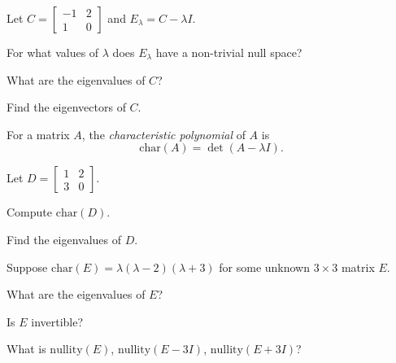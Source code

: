 \documentclass[14pt]{problemset}
\newcommand{\nnul}{\mathrm{nullity}}
\newcommand{\mat}[1]{\begin{bmatrix}#1\end{bmatrix}}
\newcommand{\chr}{\mathrm{char}}
\begin{document}
	\vspace{-.2cm}
	\question
	Let $C=\mat{-1&2\\1&0}$ and $E_\lambda = C-\lambda I$.
	\begin{parts}
		\item For what values of $\lambda$ does $E_\lambda$ have a non-trivial
			null space?
		\item What are the eigenvalues of $C$?
		\item Find the eigenvectors of $C$.
	\end{parts}
	
	\newpage
	\begin{definition}
	For a matrix $A$, the \emph{characteristic polynomial} of $A$ is
	\[
		\chr(A)=\det(A-\lambda I).
	\]
	\end{definition}
	\vspace{-.4cm}
	
	\question
	Let $D=\mat{1&2\\3&0}$.
	\begin{parts}
		\item Compute $\chr(D)$.
		\item Find the eigenvalues of $D$.
	\end{parts}

	\vspace{-.3cm}
	\question
	\vspace{-.2cm}
	Suppose $\chr(E)=\lambda(\lambda -2)(\lambda +3)$ for some unknown $3\times 3$
	matrix $E$.
	\begin{parts}
		\item What are the eigenvalues of $E$?
		\item Is $E$ invertible?
		\item What is $\nnul(E)$, $\nnul(E-3I)$, $\nnul(E+3I)$?
	\end{parts}
\end{document}
